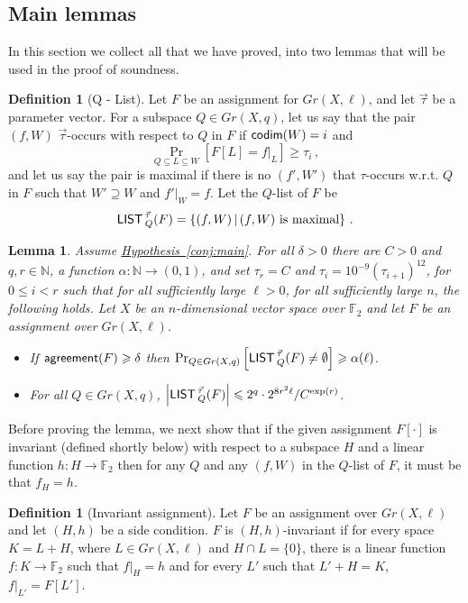 \documentclass[11pt]{article}
\numberwithin{equation}{section}
\newtheorem{lemma}[theorem]{Lemma}
\theoremstyle{definition}
\newtheorem{definition}[theorem]{Definition}
\theoremstyle{plain}
\newcommand{\expref}[2]{\hyperref[#2]{#1~\ref{#2}}}
\newcommand\card[1]{\left| {#1} \right|}
\newcommand\Prob[2]{{\Pr_{#1}\left[ {#2} \right]}}
\newcommand\Set[2]{ \left\{ #1 \,  \vert  \, #2\right\} }
\newcommand*\codimm{{\sf codim}}
\renewcommand\ge{\geqslant}
\renewcommand\le{\leqslant}
\renewcommand\supset{\supseteq}
\def\M{{\sf LIST\,}}
\def\F{\mathbb{F}}
\def\agr{{\sf agreement}}
\begin{document}
\subsection{Main lemmas}

In this section we collect all that we have proved, into two lemmas that will be used in the proof of soundness.

\begin{definition}[Q - List]\label{def:Qlist}
  Let $F$ be an assignment for $Gr(X,\ell)$, and let $\vec\tau$ be a
  parameter vector. For a subspace $Q\in Gr(X,q)$, let us say that the
  pair $(f,W)$ $\vec\tau$-occurs with respect to $Q$ in $F$ if $\codimm(W)=i$ and
\[\Prob{Q\subseteq L\subseteq W}{F[L]=f|_L} \ge \tau_i\,,
\] and let us say the pair is maximal if there is no $(f',W')$ that
$\tau$-occurs w.r.t. $Q$ in $F$ such that  $W'\supset W$ and $f'|_W=f$.
Let the $Q$-list of $F$ be \[ \M_Q^{\vec\tau}(F) = \Set{ (f,W)}{(f,W)\hbox{ is maximal}}\,.\]
\end{definition}





\begin{lemma}\label{lemma:encaps}
Assume \expref{Hypothesis}{conj:main}. For all $\delta>0$ there are
%
$C>0$ and $q,r\in \mathbb{N}$, a function $\alpha\colon\mathbb{N}\to(0,1)$, and set $\tau_r = C$ and $\tau_i = 10^{-9} (\tau_{i+1})^{12}$, for $0\le i < r$ such that for all sufficiently large $\ell>0$, for all sufficiently large $n$, the following holds. Let $X$ be an $n$-dimensional vector space over $\F_2$ and let $F$ be an assignment over $Gr(X,\ell)$.
\begin{itemize}
\item  If $\agr(F)\ge \delta$ then $\Prob{Q\in Gr(X,q)}{\M^{\vec\tau}_Q(F)\neq\emptyset} \ge \alpha(\ell)$.
%
\item For all
%
$Q\in Gr(X,q)$,%
%
$\card{\M^{\vec\tau}_Q(F)} \le 2^q \cdot 2^{8r^2\ell}/C^{\exp(r)}$.  %
\end{itemize}
\end{lemma}
Before proving the lemma, we next show that if the given assignment $F[\cdot]$ is invariant (defined shortly below) with respect to a subspace $H$ and a linear function $h:H\to\F_2$ then for any $Q$ and any $(f,W)$ in the $Q$-list of $F$, it must be that $f_H=h$.

%
\begin{definition}[Invariant assignment]\label{def:max-pair}  %
Let $F$ be an assignment over $Gr(X,\ell)$ and let $(H,h)$ be a side condition. $F$ is $(H,h)$-invariant if for every space $K=L+H$, where $L\in Gr(X,\ell)$ and $H\cap L=\{0\}$, there is a linear function $f:K\to\F_2$ such that $f|_H=h$ and for every $L'$ such that $L'+H=K$, $f|_{L'} = F[L']$.
\end{definition}
\end{document}
